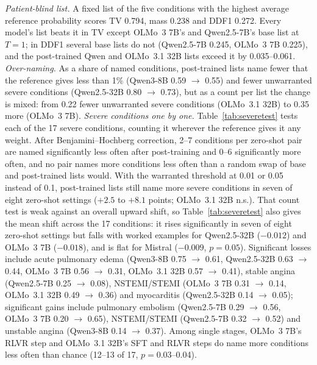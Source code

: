 \documentclass[11pt]{article}
\begin{document}
\emph{Patient-blind list.} A fixed list of the five conditions with the highest average reference probability scores TV 0.794, mass 0.238 and DDF1 0.272. Every model's list beats it in TV except OLMo~3 7B's and Qwen2.5-7B's base list at $T{=}1$; in DDF1 several base lists do not (Qwen2.5-7B 0.245, OLMo~3 7B 0.225), and the post-trained Qwen and OLMo~3.1 32B lists exceed it by 0.035--0.061.
\emph{Over-naming.} As a share of named conditions, post-trained lists name fewer that the reference gives less than 1\% (Qwen3-8B 0.59 $\rightarrow$ 0.55) and fewer unwarranted severe conditions (Qwen2.5-32B 0.80 $\rightarrow$ 0.73), but as a count per list the change is mixed: from 0.22 fewer unwarranted severe conditions (OLMo~3.1 32B) to 0.35 more (OLMo~3 7B).
\emph{Severe conditions one by one.} Table~\ref{tab:severetest} tests each of the 17 severe conditions, counting it wherever the reference gives it any weight. After Benjamini--Hochberg correction, 2--7 conditions per zero-shot pair are named significantly less often after post-training and 0--6 significantly more often, and no pair names more conditions less often than a random swap of base and post-trained lists would. With the warranted threshold at 0.01 or 0.05 instead of 0.1, post-trained lists still name more severe conditions in seven of eight zero-shot settings ($+2.5$ to $+8.1$ points; OLMo~3.1 32B n.s.). That count test is weak against an overall upward shift, so Table~\ref{tab:severetest} also gives the mean shift across the 17 conditions: it rises significantly in seven of eight zero-shot settings but falls with worked examples for Qwen2.5-32B ($-0.012$) and OLMo~3 7B ($-0.018$), and is flat for Mistral ($-0.009$, $p{=}0.05$). Significant losses include acute pulmonary edema (Qwen3-8B 0.75 $\rightarrow$ 0.61, Qwen2.5-32B 0.63 $\rightarrow$ 0.44, OLMo~3 7B 0.56 $\rightarrow$ 0.31, OLMo~3.1 32B 0.57 $\rightarrow$ 0.41), stable angina (Qwen2.5-7B 0.25 $\rightarrow$ 0.08), NSTEMI/STEMI (OLMo~3 7B 0.31 $\rightarrow$ 0.14, OLMo~3.1 32B 0.49 $\rightarrow$ 0.36) and myocarditis (Qwen2.5-32B 0.14 $\rightarrow$ 0.05); significant gains include pulmonary embolism (Qwen2.5-7B 0.29 $\rightarrow$ 0.56, OLMo~3 7B 0.20 $\rightarrow$ 0.65), NSTEMI/STEMI (Qwen2.5-7B 0.32 $\rightarrow$ 0.52) and unstable angina (Qwen3-8B 0.14 $\rightarrow$ 0.37). Among single stages, OLMo~3 7B's RLVR step and OLMo~3.1 32B's SFT and RLVR steps do name more conditions less often than chance (12--13 of 17, $p{=}0.03$--0.04).
\end{document}

